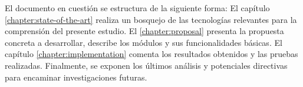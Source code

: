 El documento en cuesti\'on se estructura de la siguiente forma: El cap\'itulo \ref{chapter:state-of-the-art} realiza un bosquejo de las tecnolog\'ias relevantes para la comprensi\'on del presente estudio. El \ref{chapter:proposal} presenta la propuesta concreta a desarrollar, describe los m\'odulos y sus funcionalidades b\'asicas. El cap\'itulo \ref{chapter:implementation} comenta los resultados obtenidos y las pruebas realizadas. Finalmente, se exponen los \'ultimos an\'alisis y potenciales directivas para encaminar investigaciones futuras.




